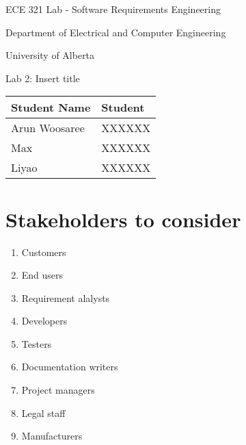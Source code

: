 \documentclass[letterpaper]{article}
\begin{document}
\begin{titlepage}
 \begin{center}

  \LARGE
  ECE 321 Lab - Software Requirements Engineering
  
  Department of Electrical and Computer Engineering
  
  University of Alberta
  
  \vspace{2cm}
  
  Lab 2: Insert title
  
  \vspace{5cm}
  \Large
  
  \begin{tabular}{ | m{5cm} | m{5cm} | }
   \hline
   Student Name  & Student \\
   \hline
   Arun Woosaree & XXXXXX  \\
   \hline
   Max           & XXXXXX  \\
   \hline
   Liyao         & XXXXXX  \\
   \hline
  \end{tabular}
  
  
  
  
 \end{center}
\end{titlepage}


\section{Stakeholders to consider}
\label{stakeholders}
\begin{enumerate}
 \item Customers
 \item End users
 \item Requirement alalysts
 \item Developers
 \item Testers
 \item Documentation writers
 \item Project managers
 \item Legal staff
 \item Manufacturers
\end{enumerate}
\end{document}
